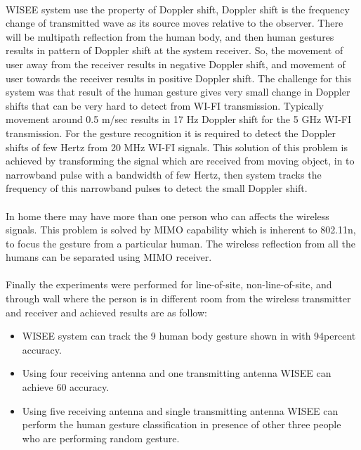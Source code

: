 \documentclass[a4paper,12pt,oneside]{article}
\begin{document}
\paragraph{}
 WISEE system use the property of Doppler shift, Doppler shift is the frequency change
of transmitted wave as its source moves relative to the observer. There will be multipath
reflection from the human body, and then human gestures results in pattern of Doppler shift at
the system receiver. So, the movement of user away from the receiver results in negative Doppler
shift, and movement of user towards the receiver results in positive Doppler shift. The challenge
for this system was that result of the human gesture gives very small change in Doppler shifts
that can be very hard to detect from WI-FI transmission. Typically movement around 0.5 m/sec
results in 17 Hz Doppler shift for the 5 GHz WI-FI transmission. For the gesture recognition it is
required to detect the Doppler shifts of few Hertz from 20 MHz WI-FI signals. This solution of
this problem is achieved by transforming the signal which are received from moving object, in to
narrowband pulse with a bandwidth of few Hertz, then system tracks the frequency of this
narrowband pulses to detect the small Doppler shift.

\paragraph{}
In home there may have more than one person who can affects the wireless signals. This
problem is solved by MIMO capability which is inherent to 802.11n, to focus the gesture from a
particular human. The wireless reflection from all the humans can be separated using MIMO
receiver.
\paragraph{}
Finally the experiments were performed for line-of-site, non-line-of-site, and through
wall where the person is in different room from the wireless transmitter and receiver and
achieved results are as follow:
\begin{itemize}
    \item WISEE system can track the 9 human body gesture shown in with 94percent accuracy.
    \item  Using four receiving antenna and one transmitting antenna WISEE can achieve 60%
accuracy.
    \item Using five receiving antenna and single transmitting antenna WISEE can perform the
human gesture classification in presence of other three people who are performing
random gesture.
\end{itemize}
\end{document}
